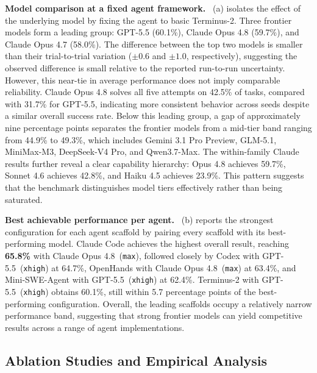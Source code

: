 \noindent\textbf{Model comparison at a fixed agent framework.}
~(a) isolates the effect of the underlying model by fixing the agent to basic Terminus-2. Three frontier models form a leading group: GPT-5.5 (60.1\%), Claude Opus 4.8 (59.7\%), and Claude Opus 4.7 (58.0\%). The difference between the top two models is smaller than their trial-to-trial variation ($\pm0.6$ and $\pm1.0$, respectively), suggesting the observed difference is small relative to the reported run-to-run uncertainty. However, this near-tie in average performance does not imply comparable reliability. Claude Opus 4.8 solves all five attempts on 42.5\% of tasks, compared with 31.7\% for GPT-5.5, indicating more consistent behavior across seeds despite a similar overall success rate. Below this leading group, a gap of approximately nine percentage points separates the frontier models from a mid-tier band ranging from 44.9\% to 49.3\%, which includes Gemini 3.1 Pro Preview, GLM-5.1, MiniMax-M3, DeepSeek-V4 Pro, and Qwen3.7-Max. The within-family Claude results further reveal a clear capability hierarchy: Opus 4.8 achieves 59.7\%, Sonnet 4.6 achieves 42.8\%, and Haiku 4.5 achieves 23.9\%. This pattern suggests that the benchmark distinguishes model tiers effectively rather than being saturated.

\noindent\textbf{Best achievable performance per agent.}
~(b) reports the strongest configuration for each agent scaffold by pairing every scaffold with its best-performing model. Claude Code achieves the highest overall result, reaching \textbf{65.8\%} with Claude Opus 4.8~(\texttt{max}), followed closely by Codex with GPT-5.5~(\texttt{xhigh}) at 64.7\%, OpenHands with Claude Opus 4.8~(\texttt{max}) at 63.4\%, and Mini-SWE-Agent with GPT-5.5~(\texttt{xhigh}) at 62.4\%. Terminus-2 with GPT-5.5~(\texttt{xhigh}) obtains 60.1\%, still within 5.7 percentage points of the best-performing configuration. Overall, the leading scaffolds occupy a relatively narrow performance band, suggesting that strong frontier models can yield competitive results across a range of agent implementations.


\subsection{Ablation Studies and Empirical Analysis}


